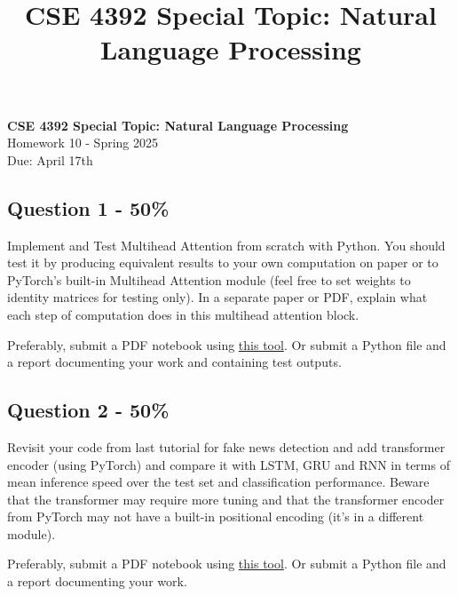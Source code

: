 \documentclass{article}
\newcommand{\answerboxbig}{
    \vspace{20cm} %
}
\begin{document}
\title{CSE 4392 Special Topic: Natural Language Processing}
\begin{center}
    \Large\textbf{CSE 4392 Special Topic: Natural Language Processing} \\
    \large Homework 10 - Spring 2025 \\
    \large Due: April 17th
\end{center}

\thispagestyle{fancy}


\subsection*{Question 1 - 50\%}
Implement and Test Multihead Attention from scratch with Python. You should test it by producing equivalent results to your own computation on paper or to PyTorch's built-in Multihead Attention module (feel free to set weights to identity matrices for testing only). In a separate paper or PDF, explain what each step of computation does in this multihead attention block.

Preferably, submit a PDF notebook using \hyperlink{https://htmtopdf.herokuapp.com/ipynbviewer/#google_vignette}{this tool}. Or submit a Python file and a report documenting your work and containing test outputs.


\answerboxbig

\subsection*{Question 2 - 50\%}
Revisit your code from last tutorial for fake news detection and add transformer encoder (using PyTorch) and compare it with LSTM, GRU and RNN in terms of mean inference speed over the test set and classification performance. Beware that the transformer may require more tuning and that the transformer encoder from PyTorch may not have a built-in positional encoding (it's in a different module).

Preferably, submit a PDF notebook using \hyperlink{https://htmtopdf.herokuapp.com/ipynbviewer/#google_vignette}{this tool}. Or submit a Python file and a report documenting your work.
\end{document}
